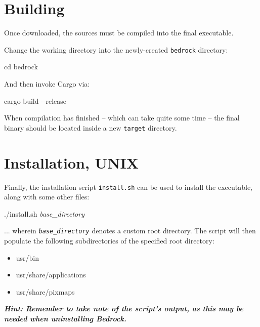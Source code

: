 \documentclass[a5paper, twoside]{report}
\begin{document}
		\section{Building}
			\label{dev:building}
			Once downloaded, the sources must be compiled into the final executable.

			Change the working directory into the newly-created \texttt{bedrock} directory:

			\begin{mdframed}
				\ttfamily
				cd bedrock
			\end{mdframed}

			And then invoke Cargo via:

			\begin{mdframed}
				\ttfamily
				cargo build -{}-release
			\end{mdframed}

			When compilation has finished -- which can take quite some time -- the final binary should be located inside a new \texttt{target} directory.

		\section{Installation, UNIX\textsuperscript{\textregistered}}
			\label{dev:unix-install}
			Finally, the installation script \texttt{install.sh} can be used to install the executable, along with some other files:

			\begin{mdframed}
				\ttfamily
				./install.sh \textit{base\_directory}
			\end{mdframed}

			... wherein \texttt{\itshape base\_directory} denotes a custom root directory.
			The script will then populate the following subdirectories of the specified root directory:

			\begin{itemize}
				\ttfamily

				\item{usr/bin}
				\item{usr/share/applications}
				\item{usr/share/pixmaps}
			\end{itemize}

			\begin{mdframed}
				\small\itshape\bfseries
				Hint: Remember to take note of the script's output, as this may be needed when uninstalling Bedrock.
			\end{mdframed}
\end{document}
